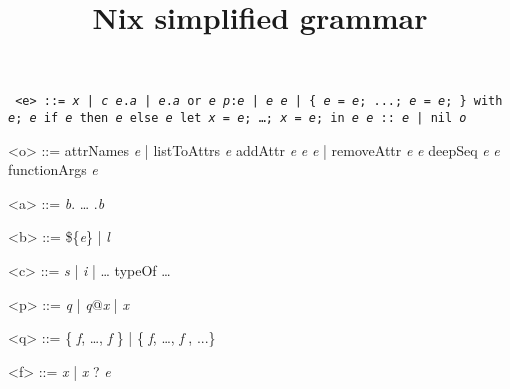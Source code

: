 \documentclass{article}
\title{Nix simplified grammar}
\date{}
\newcommand{\meta}[1]{\emph{\textsl{#1}}} %
\renewcommand{\|}{\textrm{|}}
\def\e/{\meta{e}}
\def\a/{\meta{a}}
\def\b/{\meta{b}}
\def\c/{\meta{c}}
\def\p/{\meta{p}}
\def\q/{\meta{q}}
\def\f/{\meta{f}}
\def\x/{\meta{x}}
\def\o/{\meta{o}}
\begin{document}
\maketitle{}

\begin{grammar}
  \tt
<e> ::=
    \x/ \| \c/
  \alt \e/.\a/ \| \e/.\a/ or \e/
  \alt \p/:\e/ \| \e/ \e/
  \alt [ \e/ \ldots{} \e/ ] \| \{ \e/ = \e/; ...; \e/ = \e/; \}
  \alt with \e/; \e/
  \alt if \e/ then \e/ else \e/
  \alt let \x/ = \e/; \ldots{;} \x/ = \e/; in \e/
  \alt \e/ :: \e/ \| nil
  \alt \o/

<o> ::= attrNames \e/ \| listToAttrs \e/
  \alt addAttr \e/ \e/ \e/ \| removeAttr \e/ \e/
  \alt deepSeq \e/ \e/
  \alt functionArgs \e/

<a> ::= \b/. \ldots{} .\b/

<b> ::= \$\{\e/\} \| \meta{l}

<c> ::= \meta{s} \| \meta{i} \| \ldots{}
  \alt typeOf
  \alt \ldots{}

<p> ::= \q/ \| \q/@\x/ \| \x/

<q> ::= \{ \f/, \ldots{,} \f/ \} \| \{ \f/, \ldots{,} \f/ , ...\}

<f> ::= \x/ \| \x/ ? \e/

\end{grammar}
\end{document}
